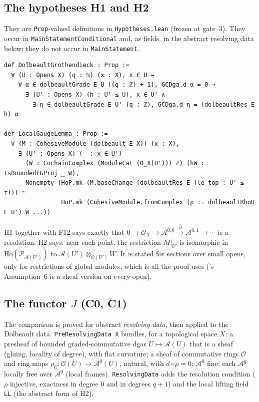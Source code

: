 \subsection{The hypotheses H1 and H2}\label{sec:hyp}
They are \texttt{Prop}-valued definitions in \texttt{Hypotheses.lean} (frozen at gate~3). They occur
in \texttt{MainStatementConditional} and, as fields, in the abstract resolving data below; they do
not occur in \texttt{MainStatement}.
\begin{verbatim}
def DolbeaultGrothendieck : Prop :=
  ∀ (U : Opens X) (q : ℕ) (x : X), x ∈ U →
    ∀ α ∈ dolbeaultGrade E U ((q : ℤ) + 1), GCDga.d α = 0 →
      ∃ (U' : Opens X) (h : U' ≤ U), x ∈ U' ∧
        ∃ η ∈ dolbeaultGrade E U' (q : ℤ), GCDga.d η = (dolbeaultRes E h) α

def LocalGaugeLemma : Prop :=
  ∀ (M : CohesiveModule (dolbeault E X)) (x : X),
    ∃ (U' : Opens X) (_ : x ∈ U')
      (W : CochainComplex (ModuleCat (O_X(U'))) ℤ) (hW : IsBoundedFGProj _ W),
      Nonempty (HoP.mk (M.baseChange (dolbeaultRes E (le_top : U' ≤ ⊤))) ≅
                HoP.mk (CohesiveModule.fromComplex (ρ := dolbeaultRhoU E U') W ...))
\end{verbatim}
H1 together with F12 says exactly that $0\to{\mathcal{O}}_X\to{\mathcal{A}}^{0,0}\xrightarrow{{\bar\partial}}{\mathcal{A}}^{0,1}\to\cdots$ is
a resolution. H2 says: near each point, the restriction $M|_{U'}$ is isomorphic in
${\mathrm{Ho}}(\mathcal P_{{\mathcal{A}}(U')})$ to ${\mathcal{A}}(U')\otimes_{{\mathcal{O}}(U')}W$. It is stated for sections over
small opens, only for restrictions of global modules, which is all the proof uses (\cite{A}'s
Assumption~6 is a sheaf version on every open).

\subsection{\texorpdfstring{The functor $J$ (C0, C1)}{The functor J (C0, C1)}}\label{sec:J}
The comparison is proved for abstract \emph{resolving data}, then applied to the Dolbeault data.
\texttt{PreResolvingData X} bundles, for a topological space $X$: a presheaf of bounded
graded-commutative dgas $U\mapsto{\mathcal{A}}(U)$ that is a sheaf (gluing, locality of degree), with flat
curvature; a sheaf of commutative rings ${\mathcal{O}}$ and ring maps $\rho_U\colon{\mathcal{O}}(U)\to{\mathcal{A}}^0(U)$,
natural, with $d\circ\rho=0$; ${\mathcal{A}}^0$ fine; each ${\mathcal{A}}^q$ locally free over ${\mathcal{A}}^0$ (local frames).
\texttt{ResolvingData} adds the resolution condition ($\rho$ injective, exactness in degree $0$ and
in degrees $q+1$) and the local lifting field \texttt{LL} (the abstract form of H2).

